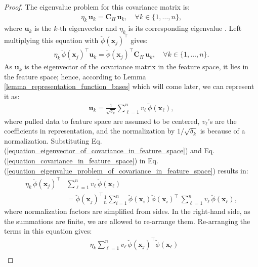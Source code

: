 \documentclass[lang=cn,10pt]{gorgeousnbook}
\numberwithin{equation}{section}%
\numberwithin{figure}{section}%
\begin{document}
\begin{proof}
The eigenvalue problem for this covariance matrix is:
\begin{align*}
\eta_k\, \boldsymbol{u}_k = \boldsymbol{C}_H\, \boldsymbol{u}_k, \quad \forall k \in \{1, \dots, n\},
\end{align*}
where $\boldsymbol{u}_k$ is the $k$-th eigenvector and $\eta_k$ is its corresponding eigenvalue \cite{ghojogh2019eigenvalue}. 
Left multiplying this equation with $\breve{\phi}(\boldsymbol{x}_j)^\top$ gives:
\begin{align}\label{equation_eigenvalue_problem_of_covariance_in_feature_space}
\eta_k\, \breve{\phi}(\boldsymbol{x}_j)^\top \boldsymbol{u}_k = \breve{\phi}(\boldsymbol{x}_j)^\top \boldsymbol{C}_H\, \boldsymbol{u}_k, \quad \forall k \in \{1, \dots, n\}.
\end{align}
As $\boldsymbol{u}_k$ is the eigenvector of the covariance matrix in the feature space, it lies in the feature space; hence, according to Lemma \ref{lemma_representation_function_bases} which will come later, we can represent it as:
\begin{align}\label{equation_eigenvector_of_covariance_in_feature_space}
\boldsymbol{u}_k = \frac{1}{\sqrt{\delta_k}} \sum_{\ell=1}^n v_\ell\, \breve{\phi}(\boldsymbol{x}_\ell), 
\end{align}
where pulled data to feature space are assumed to be centered, $v_\ell$'s are the coefficients in representation, and the normalization by $1/\sqrt{\delta_k}$ is because of a normalization.
Substituting Eq. (\ref{equation_eigenvector_of_covariance_in_feature_space}) and Eq. (\ref{equation_covariance_in_feature_space}) in Eq. (\ref{equation_eigenvalue_problem_of_covariance_in_feature_space}) results in:
\begin{align*}
\eta_k\, \breve{\phi}(\boldsymbol{x}_j)^\top &\sum_{\ell=1}^n v_\ell\, \breve{\phi}(\boldsymbol{x}_\ell) \\
&= \breve{\phi}(\boldsymbol{x}_j)^\top \frac{1}{n} \sum_{i=1}^n \breve{\phi}(\boldsymbol{x}_i) \breve{\phi}(\boldsymbol{x}_i)^\top\, \sum_{\ell=1}^n v_\ell\, \breve{\phi}(\boldsymbol{x}_\ell),
\end{align*}
where normalization factors are simplified from sides. 
In the right-hand side, as the summations are finite, we are allowed to re-arrange them. Re-arranging the terms in this equation gives:
\begin{align*}
&\eta_k \sum_{\ell=1}^n v_\ell\, \breve{\phi}(\boldsymbol{x}_j)^\top \breve{\phi}(\boldsymbol{x}_\ell) \\

\end{align*}
\end{proof}
\end{document}
